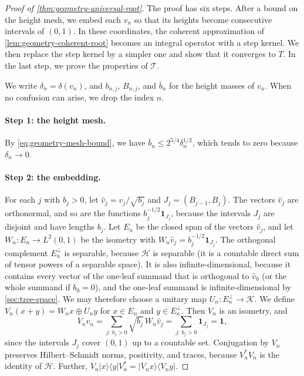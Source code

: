 \begin{proof}[Proof of \cref{thm:geometry-universal-root}]
The proof has six steps. After a bound on the height mesh, we embed each $v_n$ so that its heights become consecutive intervals of $(0,1)$. In these coordinates, the coherent approximation of \cref{lem:geometry-coherent-root} becomes an integral operator with a step kernel. We then replace the step kernel by a simpler one and show that it converges to $T$. In the last step, we prove the properties of $\mathcal T$.

We write $\delta_n=\delta(v_n)$, and $b_{n,j}$, $B_{n,j}$, and $\bar b_n$ for the height masses of $v_n$. When no confusion can arise, we drop the index $n$.

\paragraph{Step 1: the height mesh.}
By \eqref{eq:geometry-mesh-bound}, we have $\bar b_n\le2^{5/4}\delta_n^{1/2}$, which tends to zero because $\delta_n\to0$.

\paragraph{Step 2: the embedding.}
For each $j$ with $b_j>0$, let $\hat v_j=v_j/\sqrt{b_j}$ and $J_j=(B_{j-1},B_j)$. The vectors $\hat v_j$ are orthonormal, and so are the functions $b_j^{-1/2}\mathbf1_{J_j}$, because the intervals $J_j$ are disjoint and have lengths $b_j$. Let $E_n$ be the closed span of the vectors $\hat v_j$, and let $W_n\colon E_n\to L^2(0,1)$ be the isometry with $W_n\hat v_j=b_j^{-1/2}\mathbf1_{J_j}$. The orthogonal complement $E_n^\perp$ is separable, because $\mathcal H$ is separable (it is a countable direct sum of tensor powers of a separable space). It is also infinite-dimensional, because it contains every vector of the one-leaf summand that is orthogonal to $\hat v_0$ (or the whole summand if $b_0=0$), and the one-leaf summand is infinite-dimensional by \cref{sec:tree-space}. We may therefore choose a unitary map $U_n\colon E_n^\perp\to\mathcal K$. We define $V_n(x+y)=W_nx\oplus U_ny$ for $x\in E_n$ and $y\in E_n^\perp$. Then $V_n$ is an isometry, and
\[
 V_nv_n=\sum_{j:\,b_j>0}\sqrt{b_j}\,W_n\hat v_j=\sum_{j:\,b_j>0}\mathbf1_{J_j}=\mathbf1,
\]
since the intervals $J_j$ cover $(0,1)$ up to a countable set. Conjugation by $V_n$ preserves Hilbert--Schmidt norms, positivity, and traces, because $V_n^*V_n$ is the identity of $\mathcal H$. Further, $V_n|x\rangle\langle y|V_n^*=|V_nx\rangle\langle V_ny|$.


\end{proof}
